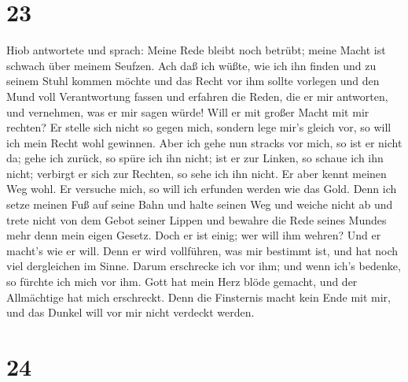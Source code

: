 \hypertarget{section-22}{%
\section{23}\label{section-22}}

 Hiob antwortete und sprach:  Meine Rede bleibt
noch betrübt; meine Macht ist schwach über meinem Seufzen. 
Ach daß ich wüßte, wie ich ihn finden und zu seinem Stuhl kommen möchte
 und das Recht vor ihm sollte vorlegen und den Mund voll
Verantwortung fassen  und erfahren die Reden, die er mir
antworten, und vernehmen, was er mir sagen würde!  Will er
mit großer Macht mit mir rechten? Er stelle sich nicht so gegen mich,
 sondern lege mir's gleich vor, so will ich mein Recht wohl
gewinnen.  Aber ich gehe nun stracks vor mich, so ist er
nicht da; gehe ich zurück, so spüre ich ihn nicht;  ist er
zur Linken, so schaue ich ihn nicht; verbirgt er sich zur Rechten, so
sehe ich ihn nicht.  Er aber kennt meinen Weg wohl. Er
versuche mich, so will ich erfunden werden wie das Gold. 
Denn ich setze meinen Fuß auf seine Bahn und halte seinen Weg und weiche
nicht ab  und trete nicht von dem Gebot seiner Lippen und
bewahre die Rede seines Mundes mehr denn mein eigen Gesetz.
 Doch er ist einig; wer will ihm wehren? Und er macht's wie
er will.  Denn er wird vollführen, was mir bestimmt ist,
und hat noch viel dergleichen im Sinne.  Darum erschrecke
ich vor ihm; und wenn ich's bedenke, so fürchte ich mich vor ihm.
 Gott hat mein Herz blöde gemacht, und der Allmächtige hat
mich erschreckt.  Denn die Finsternis macht kein Ende mit
mir, und das Dunkel will vor mir nicht verdeckt werden.

\hypertarget{section-23}{%
\section{24}\label{section-23}}


